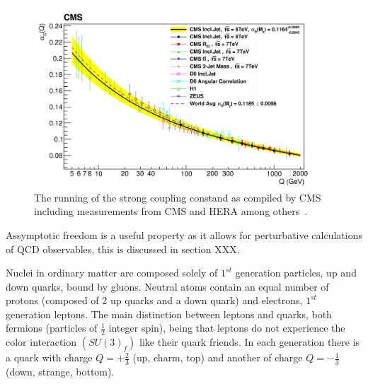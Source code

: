 \begin{figure}[htb]
\centering
\includegraphics[width=1.0\textwidth]{visuals/strong-coupling-cms2.png}
\caption{The running of the strong coupling constand as compiled by CMS including measurements from CMS and HERA among others~\cite{CMS:2014mna}.}
\label{fig:alphas}
\end{figure}






Assymptotic freedom is a useful property as it allows for perturbative calculations of QCD observables, this is discussed in section XXX.


 Nuclei in ordinary matter are composed solely of $1^{st}$ generation particles, up and down quarks, bound by gluons. Neutral atoms contain an equal number of protons (composed of 2 up quarks and a down quark) and electrons, $1^{st}$ generation leptons. The main distinction between leptons and quarks, both fermions (particles of $\frac{1}{2}$ integer spin), being that leptons do not experience the color interaction $(SU(3)_f)$ like their quark friends. In each generation there is a quark with charge $Q = + \frac{2}{3}$ (up, charm, top) and another of charge $Q = - \frac{1}{3}$ (down, strange, bottom).



